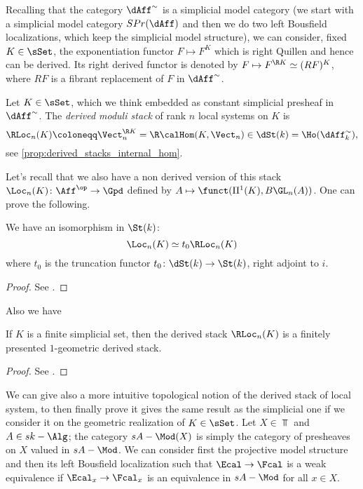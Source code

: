             Recalling that the category $\dAff^{\sim}$ is a simplicial model category (we start with a simplicial model category $SPr(\dAff)$ and then we do two left Bousfield localizations, which keep the simplicial model structure), we can consider, fixed $K \in \sSet$, the exponentiation functor $F \mapsto F^K$ which is right Quillen and hence can be derived. Its right derived functor is denoted by $F \mapsto F^{\R K} \simeq (RF)^K$, where $RF$ is a fibrant replacement of $F$ in $\dAff^{\sim}$.
            \begin{defn}
                \label{defn:derived_local_systems}
                Let $K \in \sSet$, which we think embedded as constant simplicial presheaf in $\dAff^{\sim}$. The \emph{derived moduli stack} of rank $n$ local systems on $K$ is \[\RLoc_n(K) \coloneqq \Vect_n^{\R K} = \R\calHom(K, \Vect_n)  \in \dSt(k) = \Ho(\dAff_k^{\sim}),\] see \cref{prop:derived_stacks_internal_hom}. %
            \end{defn}
            Let's recall that we also have a non derived version of this stack $\Loc_n(K)\colon \Aff^{\op} \to \Gpd$ defined by $A \mapsto \funct(\Pi^1(K), B\GL_n(A))$. One can prove the following.
            \begin{lemma}
                \label{lemma:local_system_t0}
                We have an isomorphism in $\St(k)$: \[\Loc_n(K) \simeq t_0\RLoc_n(K)\] where $t_0$ is the truncation functor $t_0\colon \dSt(k) \to \St(k)$, right adjoint to $i$.
            \end{lemma}
            \begin{proof}
                See \cite[Lemma~2.2.6.4]{ToVe:hag2}. %
            \end{proof}
            Also we have 
            \begin{lemma}
                \label{lemma:local_system_1_algebraic}
                If $K$ is a finite simplicial set, then the derived stack $\RLoc_n(K)$ is a finitely presented $1$-geometric derived stack.
            \end{lemma}
            \begin{proof}
                See \cite[Lemma~2.2.6.3]{ToVe:hag2}. %
            \end{proof}
            We can give also a more intuitive topological notion of the derived stack of local system, to then finally prove it gives the same result as the simplicial one if we consider it on the geometric realization of $K \in \sSet$. Let $X \in \Top$ and $A \in sk-\Alg$; the category $sA-\Mod(X)$ is simply the category of presheaves on $X$ valued in $sA-\Mod$. We can consider first the projective model structure and then its left Bousfield localization such that $\Ecal \to \Fcal$ is a weak equivalence if $\Ecal_x \to \Fcal_x$ is an equivalence in $sA-\Mod$ for all $x \in X$. 
